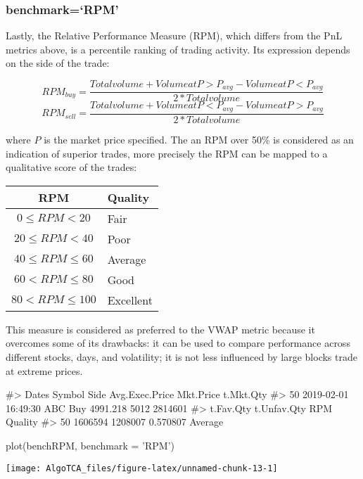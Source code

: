 \hypertarget{benchmarkrpm}{%
\subsubsection{benchmark=`RPM'}\label{benchmarkrpm}}

Lastly, the Relative Performance Measure (RPM), which differs from the
PnL metrics above, is a percentile ranking of trading activity. Its
expression depends on the side of the trade:

\[ RPM_{buy} = \frac{Total volume + Volume at P > P_{avg} - Volume at P < P_{avg}}{2 * Total volume} \]
\[ RPM_{sell} = \frac{Total volume + Volume at P < P_{avg} - Volume at P > P_{avg}}{2 * Total volume} \]

where \(P\) is the market price specified. The an RPM over 50\% is
considered as an indication of superior trades, more precisely the RPM
can be mapped to a qualitative score of the trades:

\begin{center}
\begin{tabular}{ c l }
RPM                     & Quality   \\
\hline
$ 0 \leq RPM < 20 $     & Fair      \\
$ 20 \leq RPM < 40 $      & Poor      \\
$ 40 \leq RPM \leq 60 $ & Average   \\
$ 60 < RPM \leq 80 $      & Good      \\
$ 80 < RPM \leq 100 $   & Excellent \\
\end{tabular}
\end{center}

This measure is considered as preferred to the VWAP metric because it
overcomes some of its drawbacks: it can be used to compare performance
across different stocks, days, and volatility; it is not less influenced
by large blocks trade at extreme prices.

\begin{Schunk}
\begin{Soutput}
#>                  Dates Symbol Side Avg.Exec.Price Mkt.Price t.Mkt.Qty
#> 50 2019-02-01 16:49:30    ABC  Buy       4991.218      5012   2814601
#>    t.Fav.Qty t.Unfav.Qty      RPM Quality
#> 50   1606594     1208007 0.570807 Average
\end{Soutput}
\begin{Sinput}
plot(benchRPM, benchmark = 'RPM')
\end{Sinput}

\texttt{[image: AlgoTCA\_files/figure-latex/unnamed-chunk-13-1]} \end{Schunk}

